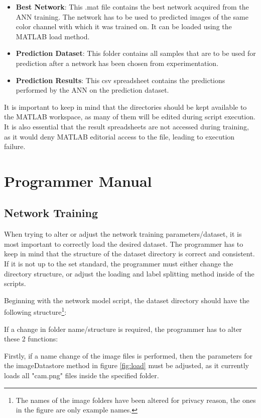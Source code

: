 \begin{itemize}
    \item \textbf{Best Network}: This .mat file contains the best network acquired from the ANN training. The network has to be used to predicted images of the same color channel with which it was trained on. It can be loaded using the MATLAB load method.
    \item \textbf{Prediction Dataset}: This folder contains all samples that are to be used for prediction after a network has been chosen from experimentation.
    \item \textbf{Prediction Results}: This csv spreadsheet contains the predictions performed by the ANN on the prediction dataset.
\end{itemize}
It is important to keep in mind that the directories should be kept available to the MATLAB workspace, as many of them will be edited during script execution. It is also essential that the result spreadsheets are not accessed during training, as it would deny MATLAB editorial access to the file, leading to execution failure.

\section{Programmer Manual}
\subsection{Network Training}
When trying to alter or adjust the network training parameters/dataset, it is most important to correctly load the desired dataset. The programmer has to keep in mind that the structure of the dataset directory is correct and consistent. If it is not up to the set standard, the programmer must either change the directory structure, or adjust the loading and label splitting method inside of the scripts.

Beginning with the network model script, the dataset directory should have the following structure\footnote{The names of the image folders have been altered for privacy reason, the ones in the figure are only example names.}:


If a change in folder name/structure is required, the programmer has to alter these 2 functions:

Firstly, if a name change of the image files is performed, then the parameters for the imageDatastore method\cite{mathworks:imgDstore} in figure \ref{fig:load} must be adjusted, as it currently loads all "cam.png" files inside the specified folder.

